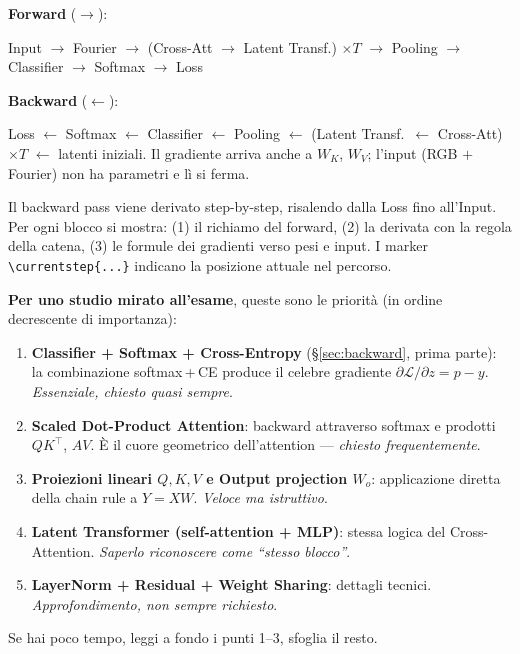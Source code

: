 \documentclass[
  11pt,
]{article}
\begin{document}
\begin{tcolorbox}[title={\textbf{Forward \& Backward Pass --- Overview}},
  colback=white, colframe=seccolor!70, boxrule=0.6pt, arc=4pt,
  left=6pt, right=6pt, top=6pt, bottom=6pt,
  fonttitle=\small, coltitle=white, colbacktitle=seccolor!70, breakable]
{\small\textbf{Forward} ($\longrightarrow$):\par
\smallskip
Input $\to$ Fourier $\to$ (Cross-Att $\to$ Latent Transf.) $\times T$ $\to$ Pooling $\to$ Classifier $\to$ Softmax $\to$ Loss}
\tcblower
{\small\textbf{Backward} ($\longleftarrow$):\par
\smallskip
Loss $\leftarrow$ Softmax $\leftarrow$ Classifier $\leftarrow$ Pooling $\leftarrow$ (Latent Transf.\ $\leftarrow$ Cross-Att) $\times T$ $\leftarrow$ latenti iniziali. Il gradiente arriva anche a $W_K$, $W_V$; l'input (RGB $+$ Fourier) non ha parametri e lì si ferma.}
\end{tcolorbox}

\begin{notabox}[title={\textbf{Struttura di questa sezione e priorità di studio}}]
Il backward pass viene derivato step-by-step, risalendo dalla Loss fino all'Input. Per ogni blocco si mostra: (1) il richiamo del forward, (2) la derivata con la regola della catena, (3) le formule dei gradienti verso pesi e input. I marker \texttt{\textbackslash currentstep\{...\}} indicano la posizione attuale nel percorso.

\medskip\textbf{Per uno studio mirato all'esame}, queste sono le priorità (in ordine decrescente di importanza):
\begin{enumerate}\setlength\itemsep{0.15em}
\item \textbf{Classifier + Softmax + Cross-Entropy} (\S\ref{sec:backward}, prima parte): la combinazione softmax\,+\,CE produce il celebre gradiente $\partial\mathcal{L}/\partial z = p - y$. \emph{Essenziale, chiesto quasi sempre}.
\item \textbf{Scaled Dot-Product Attention}: backward attraverso softmax e prodotti $QK^\top$, $AV$. È il cuore geometrico dell'attention --- \emph{chiesto frequentemente}.
\item \textbf{Proiezioni lineari $Q, K, V$ e Output projection $W_o$}: applicazione diretta della chain rule a $Y = XW$. \emph{Veloce ma istruttivo}.
\item \textbf{Latent Transformer (self-attention + MLP)}: stessa logica del Cross-Attention. \emph{Saperlo riconoscere come ``stesso blocco''}.
\item \textbf{LayerNorm + Residual + Weight Sharing}: dettagli tecnici. \emph{Approfondimento, non sempre richiesto}.
\end{enumerate}

Se hai poco tempo, leggi a fondo i punti 1--3, sfoglia il resto.
\end{notabox}
\end{document}
